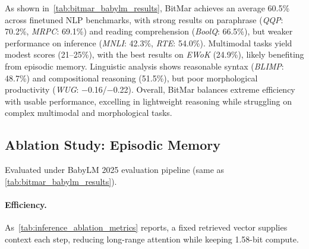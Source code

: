 As shown in~\autoref{tab:bitmar_babylm_results}, BitMar achieves an average 60.5\% across finetuned NLP benchmarks, with strong results on paraphrase (\textit{QQP}: 70.2\%, \textit{MRPC}: 69.1\%) and reading comprehension (\textit{BoolQ}: 66.5\%), but weaker performance on inference (\textit{MNLI}: 42.3\%, \textit{RTE}: 54.0\%). Multimodal tasks yield modest scores (21–25\%), with the best results on \textit{EWoK} (24.9\%), likely benefiting from episodic memory. Linguistic analysis shows reasonable syntax (\textit{BLIMP}: 48.7\%) and compositional reasoning (51.5\%), but poor morphological productivity (\textit{WUG}: −0.16/−0.22). Overall, BitMar balances extreme efficiency with usable performance, excelling in lightweight reasoning while struggling on complex multimodal and morphological tasks.

\subsection{Ablation Study: Episodic Memory}

Evaluated under BabyLM 2025 evaluation pipeline (same as \autoref{tab:bitmar_babylm_results}).

\paragraph{Efficiency.}
As~\autoref{tab:inference_ablation_metrics} reports, a fixed retrieved vector supplies context each step, reducing long-range attention while keeping 1.58-bit compute.

